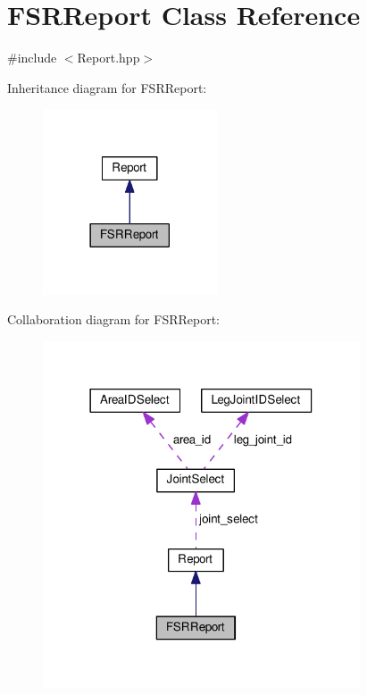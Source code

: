 \hypertarget{classFSRReport}{}\section{F\+S\+R\+Report Class Reference}
\label{classFSRReport}


{\ttfamily \#include $<$Report.\+hpp$>$}



Inheritance diagram for F\+S\+R\+Report\+:\nopagebreak
\begin{figure}[H]
\begin{center}
\leavevmode
\includegraphics[width=146pt]{classFSRReport__inherit__graph}
\end{center}
\end{figure}


Collaboration diagram for F\+S\+R\+Report\+:\nopagebreak
\begin{figure}[H]
\begin{center}
\leavevmode
\includegraphics[width=266pt]{classFSRReport__coll__graph}
\end{center}
\end{figure}

